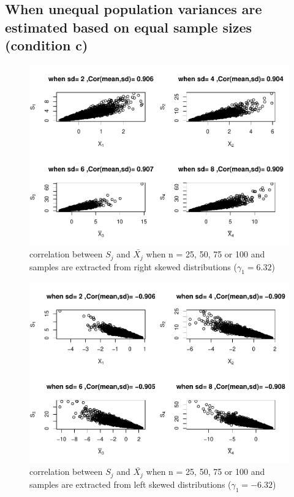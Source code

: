 \documentclass[
  man]{apa6}
\begin{document}
\hypertarget{when-unequal-population-variances-are-estimated-based-on-equal-sample-sizes-condition-c}{%
\subsection{When unequal population variances are estimated based on equal sample sizes (condition c)}\label{when-unequal-population-variances-are-estimated-based-on-equal-sample-sizes-condition-c}}

\begin{figure}
\centering
\includegraphics{Correlations-between-the-sample-means-difference-and-standardizers-of-all-estimators,-and-implications-on-biases-and-variances-of-all-estimators_files/figure-latex/Hetbalcorasafctofn1-1.pdf}
\caption{\label{fig:Hetbalcorasafctofn1}correlation between \(S_j\) and \(\bar{X_j}\) when n = 25, 50, 75 or 100 and samples are extracted from right skewed distributions (\(\gamma_1 = 6.32\))}
\end{figure}

\begin{figure}
\centering
\includegraphics{Correlations-between-the-sample-means-difference-and-standardizers-of-all-estimators,-and-implications-on-biases-and-variances-of-all-estimators_files/figure-latex/Hetbalcorasafctofn2-1.pdf}
\caption{\label{fig:Hetbalcorasafctofn2}correlation between \(S_j\) and \(\bar{X_j}\) when n = 25, 50, 75 or 100 and samples are extracted from left skewed distributions (\(\gamma_1 = -6.32\))}
\end{figure}
\end{document}
